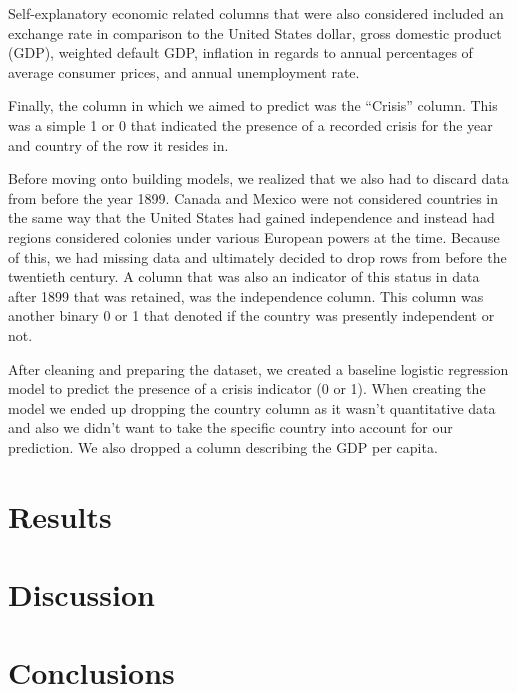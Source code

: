 \documentclass[12pt]{article}
\begin{document}
Self-explanatory economic related columns that were also considered included an exchange rate in comparison to the United States dollar, gross domestic product (GDP), weighted default GDP, inflation in regards to annual percentages of average consumer prices, and annual unemployment rate. 

Finally, the column in which we aimed to predict was the “Crisis” column. This was a simple 1 or 0 that indicated the presence of a recorded crisis for the year and country of the row it resides in.

Before moving onto building models, we realized that we also had to discard data from before the year 1899. Canada and Mexico were not considered countries in the same way that the United States had gained independence and instead had regions considered colonies under various European powers at the time. Because of this, we had missing data and ultimately decided to drop rows from before the twentieth century. A column that was also an indicator of this status in data after 1899 that was retained, was the independence column. This column was another binary 0 or 1 that denoted if the country was presently independent or not.

After cleaning and preparing the dataset, we created a baseline logistic regression model to predict the presence of a crisis indicator (0 or 1). When creating the model we ended up dropping the country column as it wasn’t quantitative data and also we didn’t want to take the specific country into account for our prediction. We also dropped a column describing the GDP per capita.


\section{Results}

\section{Discussion}

\section{Conclusions}



\printbibliography
\end{document}
